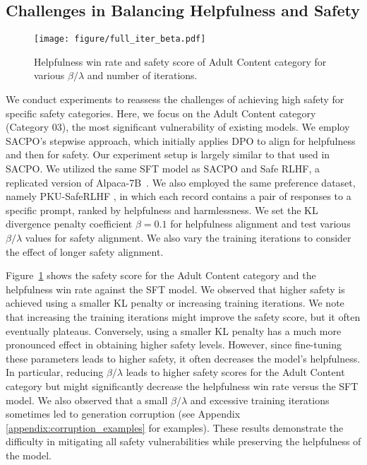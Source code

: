 \subsection{Challenges in Balancing Helpfulness and Safety}
\label{sec:challenges-safety-helpfulness}

\begin{figure}[t]
\centering
    \texttt{[image: figure/full\_iter\_beta.pdf]}
    \caption{Helpfulness win rate and safety score of Adult Content category for various  $\beta/\lambda$ and number of iterations.}
    \label{fig:full_iter_beta}
\end{figure}

We conduct experiments to reassess the challenges of achieving high safety for specific safety categories. Here, we focus on the Adult Content category (Category 03), the most significant vulnerability of existing models. We employ SACPO's stepwise approach, which initially applies DPO to align for helpfulness and then for safety. Our experiment setup is largely similar to that used in SACPO. We utilized the same SFT model as SACPO and Safe RLHF, a replicated version of Alpaca-7B~\citep{alpaca}. We also employed the same preference dataset, namely PKU-SafeRLHF \citep{ji2024beavertails}, in which each record contains a pair of responses to a specific prompt, ranked by helpfulness and harmlessness. We set the KL divergence penalty coefficient $\beta=0.1$ for helpfulness alignment and test various $\beta/\lambda$ values for safety alignment. We also vary the training iterations to consider the effect of longer safety alignment.

Figure~\ref{fig:full_iter_beta} shows the safety score for the Adult Content category and the helpfulness win rate against the SFT model.
We observed that higher safety is achieved using a smaller KL penalty or increasing training iterations. We note that increasing the training iterations might improve the safety score, but it often eventually plateaus. Conversely, using a smaller KL penalty has a much more pronounced effect in obtaining higher safety levels. However, since fine-tuning these parameters leads to higher safety, it often decreases the model's helpfulness. In particular, reducing $\beta/\lambda$ leads to higher safety scores for the Adult Content category but might significantly decrease the helpfulness win rate versus the SFT model. We also observed that a small $\beta/\lambda$ and excessive training iterations sometimes led to generation corruption (see Appendix \ref{appendix:corruption_examples} for examples). These results demonstrate the difficulty in mitigating all safety vulnerabilities while preserving the helpfulness of the model.


